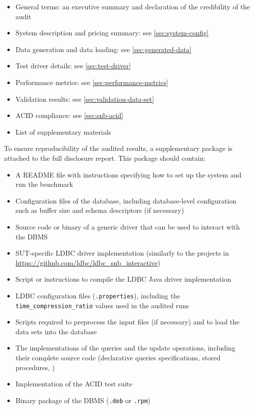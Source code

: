 \begin{itemize}
    \item General terms: an executive summary and declaration of the credibility of the audit
    \item System description and pricing summary: see \autoref{sec:system-config}
    \item Data generation and data loading: see \autoref{sec:generated-data}
    \item Test driver details: see \autoref{sec:test-driver}
    \item Performance metrics: see \autoref{sec:performance-metrics}
    \item Validation results: see \autoref{sec:validation-data-set}
    \item ACID compliance: see \autoref{sec:snb-acid}
    \item List of supplementary materials
\end{itemize}

To ensure reproducibility of the audited results, a supplementary package is attached to the full disclosure report. This package should contain:

\begin{itemize}
    \item A README file with instructions specifying how to set up the system and run the benchmark
    \item Configuration files of the database, including database-level configuration such as buffer size and schema descriptors (if necessary)
    \item Source code or binary of a generic driver that can be used to interact with the DBMS
    \item SUT-specific LDBC driver implementation (similarly to the projects in \url{https://github.com/ldbc/ldbc_snb_interactive})
    \item Script or instructions to compile the LDBC Java driver implementation
    \item LDBC configuration files (\texttt{.properties}), including the \texttt{time\_compression\_ratio} values used in the audited runs
    \item Scripts required to preprocess the input files (if necessary) and to load the data sets into the database
    \item The implementations of the queries and the update operations, including their complete source code (\eg declarative queries specifications, stored procedures, \etc)
    \item Implementation of the ACID test suite
    \item Binary package of the DBMS (\eg \texttt{.deb} or \texttt{.rpm})
\end{itemize}

